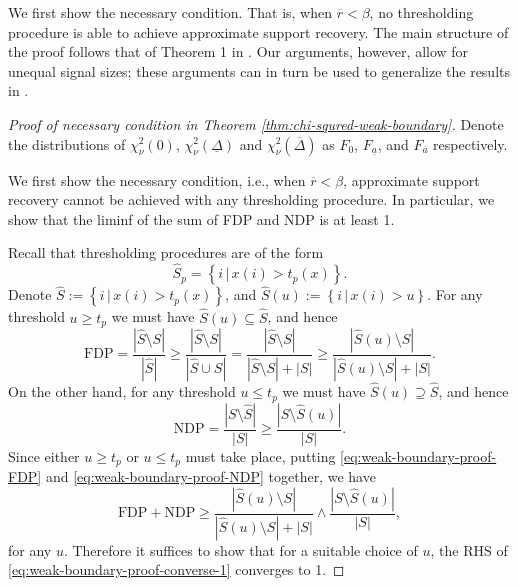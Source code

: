 We first show the necessary condition. 
That is, when $\overline{r} < \beta$, no thresholding procedure is able to achieve approximate support recovery.
The main structure of the proof follows that of Theorem 1 in \citet{arias2017distribution}. 
Our arguments, however, allow for unequal signal sizes; these arguments can in turn be used to generalize the results in \cite{arias2017distribution}.

\begin{proof}[Proof of necessary condition in Theorem \ref{thm:chi-squred-weak-boundary}]
Denote the distributions of $\chi^2_\nu(0)$, $\chi^2_\nu(\underline{\Delta})$ and $\chi^2_\nu(\overline{\Delta})$ as $F_0$, $F_{\underline{a}}$, and $F_{\overline{a}}$ respectively.

We first show the necessary condition, i.e., when $\overline{r}<\beta$, approximate support recovery cannot be achieved with any thresholding procedure.
In particular, we show that the liminf of the sum of FDP and NDP is at least 1.

Recall that thresholding procedures are of the form
$$
\widehat{S}_p = \left\{i\,|\,x(i) > t_p(x)\right\}.
$$
Denote $\widehat{S} := \left\{i\,|\,x(i) > t_p(x)\right\}$, and $\widehat{S}(u) := \left\{i\,|\,x(i) > u\right\}$.
For any threshold $u\ge t_p$ we must have $\widehat{S}(u)\subseteq\widehat{S}$, and hence
\begin{equation} \label{eq:weak-boundary-proof-FDP}
    \text{FDP} = \frac{|\widehat{S}\setminus{S}|}{|\widehat{S}|} \ge \frac{|\widehat{S}\setminus{S}|}{|\widehat{S}\cup{S}|} = \frac{|\widehat{S}\setminus{S}|}{|\widehat{S}\setminus{S}| + |S|} \ge
    \frac{|\widehat{S}(u)\setminus{S}|}{|\widehat{S}(u)\setminus{S}| + |S|}.
\end{equation}
On the other hand, for any threshold $u\le t_p$ we must have $\widehat{S}(u)\supseteq\widehat{S}$, and hence
\begin{equation} \label{eq:weak-boundary-proof-NDP}
    \text{NDP} = \frac{|{S}\setminus\widehat{S}|}{|{S}|} \ge 
    \frac{|{S}\setminus\widehat{S}(u)|}{|{S}|}.
\end{equation}
Since either $u\ge t_p$ or  $u\le t_p$ must take place, putting \eqref{eq:weak-boundary-proof-FDP} and \eqref{eq:weak-boundary-proof-NDP} together, we have
\begin{equation} \label{eq:weak-boundary-proof-converse-1}
    \text{FDP} + \text{NDP} 
    \ge \frac{|\widehat{S}(u)\setminus{S}|}{|\widehat{S}(u)\setminus{S}|+|{S}|} \wedge \frac{|{S}\setminus\widehat{S}(u)|}{|{S}|},
\end{equation}
for any $u$.
Therefore it suffices to show that for a suitable choice of $u$, the RHS of \eqref{eq:weak-boundary-proof-converse-1} converges to 1.


\end{proof}
